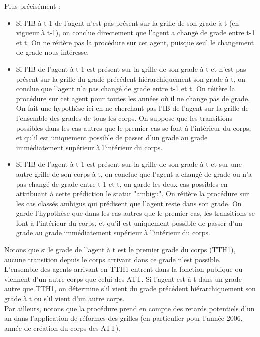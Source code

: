 \documentclass[11pt,a4paper]{article}
\begin{document}
Plus précisément :
\begin{itemize} 
	\item Si l'IB à t-1 de l'agent n'est pas présent sur la grille de son grade à t (en vigueur à t-1), on conclue directement que l'agent a changé de grade entre t-1 et t. On ne réitère pas la procédure sur cet agent, puisque seul le changement de grade nous intéresse. 
	
	\item Si l'IB de l'agent à t-1 est présent sur la grille de son grade à t et n'est pas présent sur la grille du grade précédent hiérarchiquement son grade à t, on conclue que l'agent n'a pas changé de grade entre t-1 et t. On réitère la procédure sur cet agent pour toutes les années où il ne change pas de grade. On fait une hypothèse ici en ne cherchant pas l'IB de l'agent sur la grille de l'ensemble des grades de tous les corps. On suppose que les transitions possibles dans les cas autres que le premier cas se font à l'intérieur du corps, et qu'il est uniquement possible de passer d'un grade au grade immédiatement supérieur à l'intérieur du corps.
	\item Si l'IB de l'agent à t-1 est présent sur la grille de son grade à t et sur une autre grille de son corps à t, on conclue que l'agent a changé de grade ou n'a pas changé de grade entre t-1 et t, on garde les deux cas possibles en attribuant à cette prédiction le statut "ambigu". On réitère la procédure sur les cas classés ambigus qui prédisent que l'agent reste dans son grade. On garde l'hypothèse que dans les cas autres que le premier cas, les transitions se font à l'intérieur du corps, et qu'il est uniquement possible de passer d'un grade au grade immédiatement supérieur à l'intérieur du corps.
\end{itemize}

Notons que si le grade de l'agent à t est le premier grade du corps (TTH1), aucune transition depuis le corps arrivant dans ce grade n'est possible. L'ensemble des agents arrivant en TTH1 entrent dans la fonction publique ou viennent d'un autre corps que celui des ATT. Si l'agent est à t dans un grade autre que TTH1, on détermine s'il vient du grade précédent hiérarchiquement son grade à t ou s'il vient d'un autre corps.\\

Par ailleurs, notons que la procédure prend en compte des retards potentiels d'un an dans l'application de réformes des grilles (en particulier pour l'année 2006, année de création du corps des ATT).\\
\end{document}

